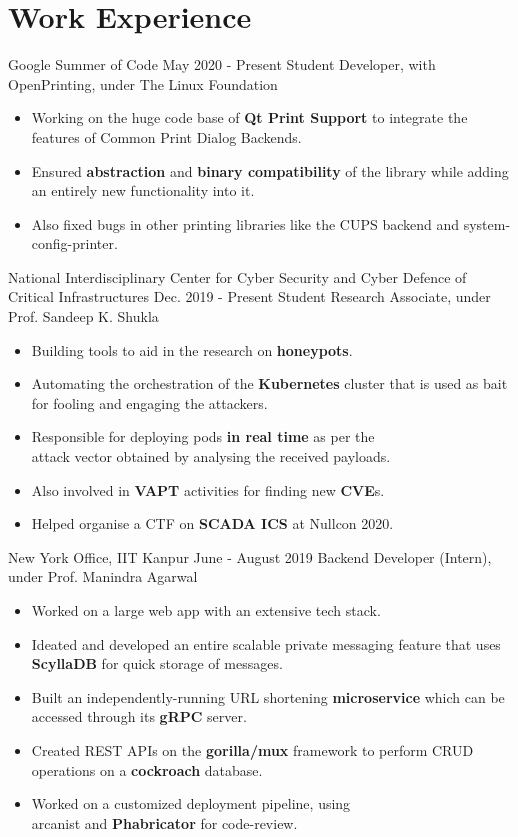 \section*{\sc Work Experience}
\vspace{-2mm}
\hrulefill
\vspace{1mm}

\excventry
{Google Summer of Code}
{May 2020 - Present}
{Student Developer, with OpenPrinting, under The Linux Foundation}
{
  \begin{itemize}
    \item Working on the huge code base of \textbf{Qt Print Support} to integrate the features of Common Print Dialog Backends.
    \item Ensured \textbf{abstraction} and \textbf{binary compatibility} of the library while adding an entirely new functionality into it.
    \item Also fixed bugs in other printing libraries like the CUPS backend and system-config-printer.
  \end{itemize}
}

\excventry
{National Interdisciplinary Center for Cyber Security and Cyber Defence of Critical Infrastructures}
{Dec. 2019 - Present}
{Student Research Associate, under Prof. Sandeep K. Shukla}
{
  \begin{itemize}
    \item Building tools to aid in the research on \textbf{honeypots}.
    \item Automating the orchestration of the \textbf{Kubernetes} cluster that is used as bait for fooling and engaging the attackers.
    \item Responsible for deploying pods \textbf{in real time} as per the\\attack vector obtained by analysing the received payloads.
    \item Also involved in \textbf{VAPT} activities for finding new \textbf{CVE}s.
    \item Helped organise a CTF on \textbf{SCADA ICS} at Nullcon 2020.
  \end{itemize}
}

\excventry
{New York Office, IIT Kanpur}
{June - August 2019}
{Backend Developer (Intern), under Prof. Manindra Agarwal}
{
  \begin{itemize}
    \item Worked on a large web app with an extensive tech stack.
    \item Ideated and developed an entire scalable private messaging feature that uses \textbf{ScyllaDB} for quick storage of messages.
    \item Built an independently-running URL shortening \textbf{microservice} which can be accessed through its \textbf{gRPC} server.
    \item Created REST APIs on the \textbf{gorilla/mux} framework to perform CRUD operations on a \textbf{cockroach} database.
    \item Worked on a customized deployment pipeline, using\\ arcanist and \textbf{Phabricator} for code-review.
  \end{itemize}
}

